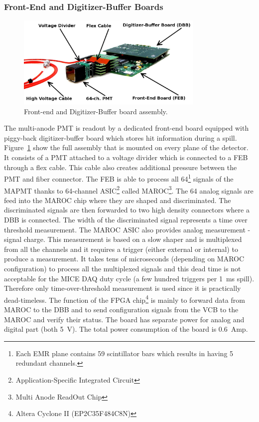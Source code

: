 \documentclass[a4paper,11pt]{article}
\begin{document}
\subsubsection{Front-End and Digitizer-Buffer Boards}
\begin{figure}[htp!]
 \centering
 \includegraphics[width=0.8\textwidth]{./feb_dbb}
 \caption[Front-end and buffer board assembly]{Front-end and Digitizer-Buffer board assembly.}
 \label{fig:feb_dbb}
\end{figure}

The multi-anode PMT is readout by a dedicated front-end board equipped with piggy-back digitizer-buffer board which stores hit information during
a spill. Figure~\ref{fig:feb_dbb} show the full assembly that is mounted on every plane of the detector. It consists of a PMT attached to a voltage
divider which is connected to a FEB through a flex cable. This cable also creates additional pressure between the PMT and fiber connector. The FEB
is able to process all 64\footnote{Each EMR plane contains 59 scintillator bars which results in having 5 redundant channels.} signals of the MAPMT
thanks to 64-channel ASIC\footnote{Application-Specific Integrated Circuit} called MAROC\footnote{Multi Anode ReadOut Chip}. The 64 analog signals
are feed into the MAROC chip where they are shaped and discriminated. The discriminated signals are then forwarded to two high density connectors
where a DBB is connected. The width of the discriminated signal represents a time over threshold measurement. The MAROC ASIC also provides analog
measurement - signal charge. This measurement is based on a slow shaper and is multiplexed from all the channels and it requires a trigger (either
external or internal) to produce a measurement. It takes tens of microseconds (depending on MAROC configuration) to process all the multiplexed
signals and this dead time is not acceptable for the MICE DAQ duty cycle (a few hundred triggers per 1~ms spill). Therefore only time-over-threshold
measurement is used since it is practically dead-timeless. The function of the FPGA chip\footnote{Altera Cyclone II (EP2C35F484C8N)} is mainly to
forward data from MAROC to the DBB and to send configuration signals from the VCB to the MAROC and verify their status. The board has separate power
for analog and digital part (both 5~V). The total power consumption of the board is 0.6~Amp.
\end{document}
